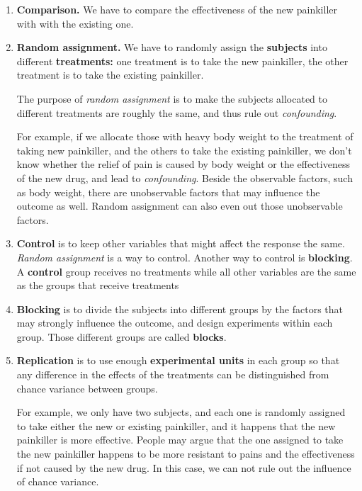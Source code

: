 \documentclass[a4paper, 12pt,twoside]{book}
\begin{document}
    \begin{enumerate}[(1)]
        \item \textbf{Comparison.} We have to compare the effectiveness of the new painkiller with with the existing one.
        \item \textbf{Random assignment.} We have to randomly assign the \textbf{subjects} into different \textbf{treatments:} one treatment is to take the new painkiller, the other treatment is to take the existing painkiller. 
        \vspace{0.3cm}
        
        \colorbox{babypink}{\parbox{0.9\textwidth}{
The purpose of \textit{random assignment} is to make the subjects allocated to different treatments are roughly the same, and thus rule out \textit{confounding}.
}}
\vspace{0.3cm}
        
 For example, if we allocate those with heavy body weight to the treatment of taking new painkiller, and the others to take the existing painkiller, we don't know whether the relief of pain is caused by body weight or the effectiveness of the new drug, and lead to \textit{confounding}. Beside the observable factors, such as body weight, there are unobservable factors that may influence the outcome as well. Random assignment can also even out those unobservable factors.
        \item \textbf{Control} is to keep other variables that might affect the response the same. \textit{Random assignment} is a way to control.  Another way to control is  \textbf{blocking}. A \textbf{control} group receives no treatments while all other variables are the same as the groups that receive treatments
        \item \textbf{Blocking} is to divide the subjects into different groups by the factors that may strongly influence the outcome, and design experiments within each group. Those different groups are called \textbf{blocks}.
        \item \textbf{Replication} is to use enough \textbf{experimental units} in each group so that any difference in the effects of the treatments can be distinguished from chance variance between groups.
        \vspace{0.3cm}
        
    For example, we only have two subjects, and each one is randomly assigned to take either the new or existing painkiller, and it happens that the new painkiller is more effective. People may argue that the one assigned to take the new painkiller happens to be more resistant to pains and the effectiveness if not caused by the new drug. In this case, we can not rule out the influence of chance variance.  
    \end{enumerate}
    \vspace{0.3cm}
    
\end{document}
